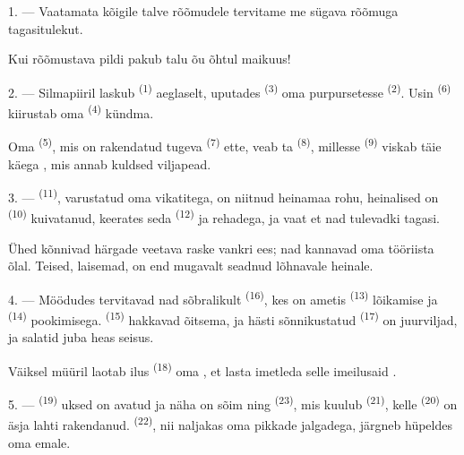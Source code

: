 \VUsaut{4.0mm}

1. --- Vaatamata kõigile talve rõõmudele tervitame me sügava rõõmuga 
tagasitulekut.

Kui rõõmustava pildi pakub talu õu õhtul maikuus!

2. --- Silmapiiril laskub  \textsuperscript{(1)} aeglaselt, uputades
 \textsuperscript{(3)} oma purpursetesse 
\textsuperscript{(2)}. Usin  \textsuperscript{(6)} kiirustab oma
 \textsuperscript{(4)} kündma.

Oma  \textsuperscript{(5)}, mis on rakendatud tugeva 
\textsuperscript{(7)} ette, veab ta  \textsuperscript{(8)}, millesse
 \textsuperscript{(9)} viskab täie käega , mis annab
kuldsed viljapead.

3. ---  \textsuperscript{(11)}, varustatud oma vikatitega, on niitnud
heinamaa rohu, heinalised on  \textsuperscript{(10)} kuivatanud,
keerates seda  \textsuperscript{(12)} ja rehadega, ja vaat et nad
tulevadki tagasi.

Ühed kõnnivad härgade veetava raske vankri ees; nad kannavad oma tööriista õlal.
Teised, laisemad, on end mugavalt seadnud lõhnavale heinale.

4. --- Möödudes tervitavad nad sõbralikult  \textsuperscript{(16)}, kes
on ametis  \textsuperscript{(13)}  lõikamise ja
 \textsuperscript{(14)} pookimisega. 
\textsuperscript{(15)} hakkavad õitsema, ja hästi sõnnikustatud 
\textsuperscript{(17)} on juurviljad,  ja salatid juba heas seisus.

Väiksel müüril laotab ilus  \textsuperscript{(18)} oma ,
et lasta imetleda selle imeilusaid .

\VUsaut{3.0mm}

5. ---  \textsuperscript{(19)} uksed on avatud ja näha on sõim ning
 \textsuperscript{(23)}, mis kuulub 
\textsuperscript{(21)}, kelle  \textsuperscript{(20)} on äsja lahti
rakendanud. 
\textsuperscript{(22)}, nii naljakas oma pikkade jalgadega, järgneb hüpeldes oma emale.

